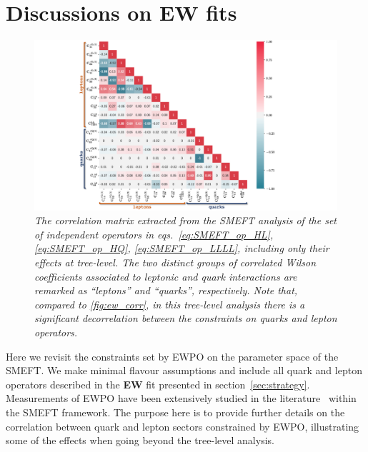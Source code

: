 



\section{Discussions on EW fits}
\label{app:EW}

\begin{figure}[t]
	\centering
	\includegraphics[width=\textwidth]{figures/heatmap_EW.pdf}
	\caption{\it The correlation matrix extracted from the SMEFT analysis of the set of independent operators in eqs.~\eqref{eq:SMEFT_op_HL}, \eqref{eq:SMEFT_op_HQ}, \eqref{eq:SMEFT_op_LLLL}, including only their effects at tree-level. The two distinct groups of correlated Wilson coefficients associated to leptonic and quark interactions are remarked as ``leptons'' and ``quarks'', respectively. Note that, compared to \autoref{fig:ew_corr}, in this tree-level analysis there is a significant decorrelation between the constraints on quarks and lepton operators.
	}
	\label{fig:ew_corr_tree}
\end{figure}

Here we revisit the constraints set by EWPO on the parameter space of the SMEFT. We make minimal flavour assumptions and include all quark and lepton operators described in the {\bf EW} fit presented in section~\ref{sec:strategy}. Measurements of EWPO have been extensively studied in the literature~\cite{Han:2004az,delAguila:2011zs,Ciuchini:2013pca,deBlas:2013gla,Falkowski:2014tna,Berthier:2015oma,Efrati:2015eaa,deBlas:2016nqo,deBlas:2017wmn,Ellis:2018gqa,Dawson:2019clf} within the SMEFT framework. The purpose here is to provide further details on the correlation between quark and lepton sectors constrained by EWPO, illustrating some of the effects when going beyond the tree-level analysis. 

